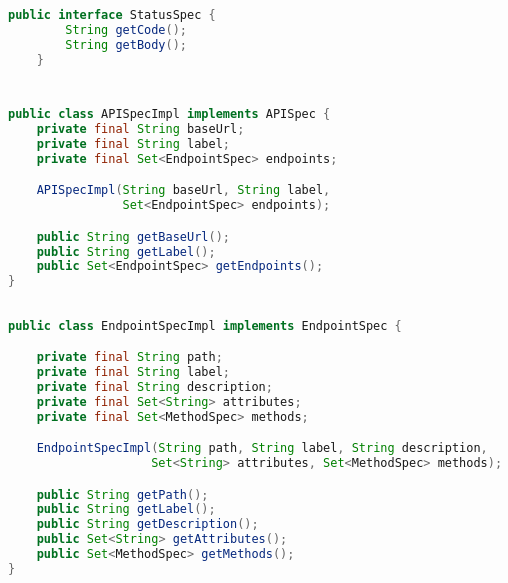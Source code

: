 \subsection{}

\begin{lstlisting}[language=Java]
    public interface StatusSpec {
        String getCode();
        String getBody();
    }
\end{lstlisting}


\section{}

\subsection{}

\begin{lstlisting}[language=Java]
public class APISpecImpl implements APISpec {
    private final String baseUrl;
    private final String label;
    private final Set<EndpointSpec> endpoints;

    APISpecImpl(String baseUrl, String label,
                Set<EndpointSpec> endpoints);

    public String getBaseUrl();
    public String getLabel();
    public Set<EndpointSpec> getEndpoints();
}
\end{lstlisting}

\subsection{}

\begin{lstlisting}[language=Java]
public class EndpointSpecImpl implements EndpointSpec {

    private final String path;
    private final String label;
    private final String description;
    private final Set<String> attributes;
    private final Set<MethodSpec> methods;

    EndpointSpecImpl(String path, String label, String description,
                    Set<String> attributes, Set<MethodSpec> methods);

    public String getPath();
    public String getLabel();
    public String getDescription();
    public Set<String> getAttributes();
    public Set<MethodSpec> getMethods();
} 
\end{lstlisting}

